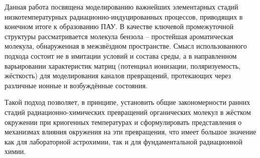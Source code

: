 {Данная работа посвящена моделированию важнейших элементарных стадий низкотемпературных радиационно-индуцированных процессов, приводящих в конечном итоге к образованию ПАУ. В качестве ключевой промежуточной структуры рассматривается молекула бензола – простейшая ароматическая молекула, обнаруженная в межзвёздном пространстве. Смысл использованного подхода состоит не в имитации условий и состава среды, а в направленном варьировании характеристик матриц (потенциал ионизации, поляризуемость, жёсткость) для моделирования каналов превращений, протекающих через различные ионные и возбуждённые состояния.

Такой подход позволяет, в принципе, установить общие закономерности ранних стадий радиационно-химических превращений органических молекул в жёстком окружении при криогенных температурах и сформулировать представления о механизмах влияния окружения на эти превращения, что имеет большое значение как для лабораторной астрохимии, так и для фундаментальной радиационной химии.

}